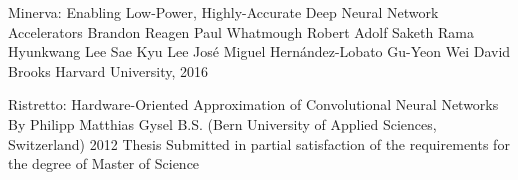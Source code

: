 \documentclass[letterpaper, 10 pt, conference]{ieeeconf}
\begin{document}
\begin{thebibliography}{99}

 Minerva: Enabling Low-Power, Highly-Accurate
Deep Neural Network Accelerators
Brandon Reagen Paul Whatmough Robert Adolf Saketh Rama
Hyunkwang Lee Sae Kyu Lee José Miguel Hernández-Lobato
Gu-Yeon Wei David Brooks
Harvard University, 2016 

 Ristretto: Hardware-Oriented Approximation of Convolutional Neural Networks
By Philipp Matthias Gysel B.S. (Bern University of Applied Sciences, Switzerland) 2012
Thesis Submitted in partial satisfaction of the requirements for the degree of
Master of Science

\end{thebibliography}
\end{document}
